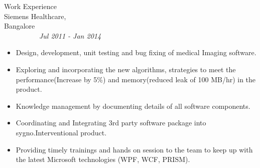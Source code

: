 \documentclass{resume}
\begin{document}
\begin{category}{Work Experience}
\\
Siemens Healthcare, Bangalore~~~~~~~~~~~~~~~~~~~~~~~~~~~~~~~~~~~~~~~~~~~~~~~~~~~~~~~~~~~~~~~~~~~~~~~~~\textit{Jul 2011 - Jan 2014}
\begin{itemize}
    \item {Design, development, unit testing and bug fixing of medical Imaging software.}
    \item {Exploring and incorporating the new algorithms, strategies to meet the performance(Increase by 5\%) and memory(reduced leak of 100 MB/hr) in the product.}
    \item {Knowledge management by documenting details of all software components.}
    \item {Coordinating and Integrating 3rd party software package into sygno.Interventional product.}
    \item {Providing timely trainings and hands on session to the team to keep up with the latest Microsoft technologies (WPF, WCF, PRISM).}\\
\end{itemize}

\end{category}
\end{document}
